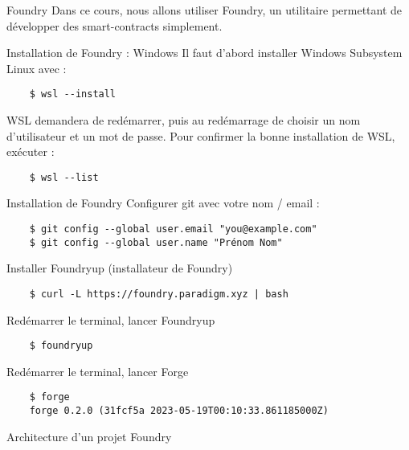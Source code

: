 
\begin{frame}{Foundry}
  Dans ce cours, nous allons utiliser Foundry, un utilitaire permettant de développer des smart-contracts simplement.
\end{frame}

\begin{frame}[fragile]{Installation de Foundry : Windows}
  Il faut d'abord installer Windows Subsystem Linux avec :
  \begin{verbatim}
    $ wsl --install
  \end{verbatim}

  WSL demandera de redémarrer, puis au redémarrage de choisir un nom d'utilisateur et un mot de passe.
  Pour confirmer la bonne installation de WSL, exécuter :

  \begin{verbatim}
    $ wsl --list
  \end{verbatim}
\end{frame}

\begin{frame}[fragile]{Installation de Foundry}
  Configurer git avec votre nom / email :

  \begin{verbatim}
    $ git config --global user.email "you@example.com"
    $ git config --global user.name "Prénom Nom"
  \end{verbatim}

  Installer Foundryup (installateur de Foundry)
  \begin{verbatim}
    $ curl -L https://foundry.paradigm.xyz | bash
  \end{verbatim}

  Redémarrer le terminal, lancer Foundryup
  \begin{verbatim}
    $ foundryup
  \end{verbatim}

  Redémarrer le terminal, lancer Forge
  \begin{verbatim}
    $ forge
    forge 0.2.0 (31fcf5a 2023-05-19T00:10:33.861185000Z)
  \end{verbatim}
\end{frame}

\begin{frame}{Architecture d'un projet Foundry}
\end{frame}
